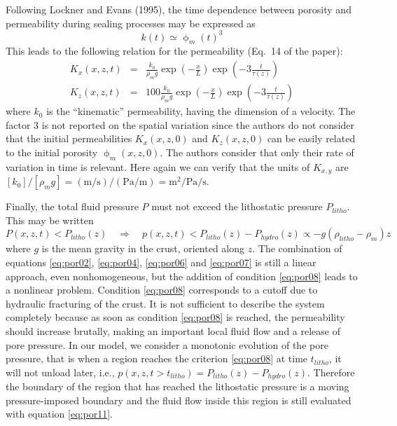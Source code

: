 Following Lockner and Evans (1995), the time
dependence between porosity and permeability during sealing 
processes may be expressed as
\begin{equation}
k(t) \simeq \upphi_m(t)^3
\label{eq:por05}
\end{equation}
This leads to the following relation for the permeability (Eq.~14 of the paper):
\begin{eqnarray}
K_x(x,z,t) &=& \frac{k_0 }{\rho_m g}  \exp\left(-\frac{x}{L}\right) \exp\left(-3\frac{t}{\tau(z)}\right) \label{eq:por06}\\
K_z(x,z,t) &=& 100\frac{k_0 }{\rho_m g}  \exp\left(-\frac{x}{L}\right) \exp\left(-3\frac{t}{\tau(z)}\right)
 \label{eq:por07}
\end{eqnarray}
where $k_0$ is the ``kinematic'' permeability, having the
dimension of a velocity. The factor 3 is not reported on the
spatial variation since the authors do not consider that the initial
permeabilities $K_x (x, z,0)$ and $K_z (x, z,0)$ can be easily related
to the initial porosity $\upphi_m (x,z,0)$. The authors consider that only their
rate of variation in time is relevant. 
Here again we can verify that the units of $K_{x,y}$ are 
$[k_0]/[\rho_m g]=(\si{\meter\per\second})/(\si{\pascal}/\si{\meter})
=\si{\square\meter\per\pascal\per\second}$.

Finally, the total fluid pressure $P$ 
must not exceed the lithostatic pressure $P_{litho}$. This may
be written
\begin{equation}
P(x,z,t)<P_{litho}(z) \quad\Rightarrow\quad
p(x,z,t)<P_{litho}(z)-P_{hydro}(z) \propto -g(\rho_{litho}-\rho_m)z
\label{eq:por08}
\end{equation}
where $g$ is the mean gravity in the crust, oriented along $z$.
The combination of equations 
\eqref{eq:por02}, \eqref{eq:por04}, \eqref{eq:por06} and \eqref{eq:por07} is still a
linear approach, even nonhomogeneous, but the addition of
condition \eqref{eq:por08} leads to a nonlinear problem. Condition \eqref{eq:por08}
corresponds to a cutoff due to hydraulic fracturing of the
crust. It is not sufficient to describe the system completely
because as soon as condition \eqref{eq:por08} is reached, the
permeability should increase brutally, making an important
local fluid flow and a release of pore pressure. 
In our model,
we consider a monotonic evolution of the pore pressure, that
is when a region reaches the criterion \eqref{eq:por08} at time $t_{litho}$, it
will not unload later, i.e., $p(x,z,t > t_{litho}) = P_{litho}(z)-P_{hydro}(z)$.
Therefore the boundary of the region that has reached the
lithostatic pressure is a moving pressure-imposed boundary
and the fluid flow inside this region is still evaluated with
equation \eqref{eq:por11}.

